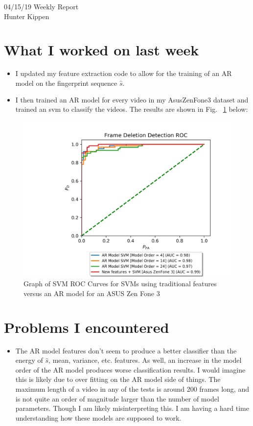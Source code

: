 \documentclass[12pt]{article}%
\def\bi{\begin{itemize}     %
\vspace{-0.5em}\setlength\itemsep{0em}}
\begin{document}
\begin{center}
{\LARGE 04/15/19 Weekly Report}\\
\vspace{0.5em}
{\Large Hunter Kippen}
\vspace{0.5em}
\end{center}


\section{What I worked on last week}
\bi
\item I updated my feature extraction code to allow for the training of an AR model on the fingerprint sequence $\hat{s}$.
\item I then trained an AR model for every video in my AsusZenFone3 dataset and trained an svm to classify the videos. The results are shown in Fig. ~\ref{AR} below:

\end{itemize}


\begin{figure}[htbp]
\centerline{\includegraphics[width=0.9\linewidth]{../Graphs/perror_AR_model_comparison_roc.png}}
\caption{Graph of SVM ROC Curves for SVMs using traditional features versus an AR model for an ASUS Zen Fone 3}
\label{AR}
\end{figure}

\section{Problems I encountered}
\bi
\item The AR model features don't seem to produce a better classifier than the energy of $\hat{s}$, mean, variance, etc. features. As well, an increase in the model order of the AR model produces worse classification results. I would imagine this is likely due to over fitting on the AR model side of things. The maximum length of a video in any of the tests is around 200 frames long, and is not quite an order of magnitude larger than the number of model parameters. Though I am likely misinterpreting this. I am having a hard time understanding how these models are supposed to work.
\end{itemize}
\end{document}
